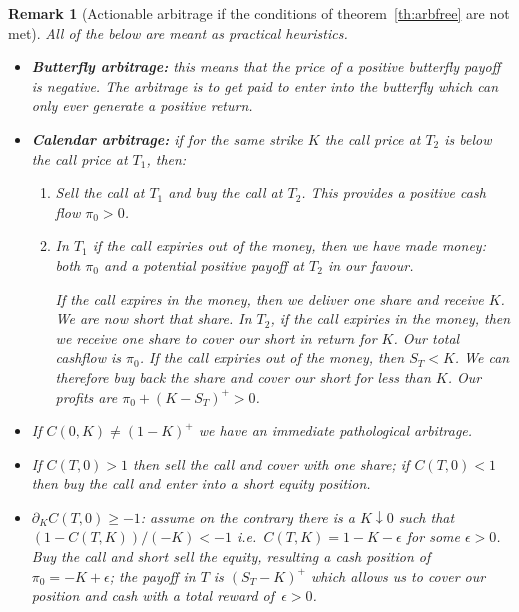 \documentclass[11pt,a4paper]{article}
\newtheorem{remark}[definition]{Remark}
\begin{document}
\begin{remark}[Actionable arbitrage if the conditions of theorem~\ref{th:arbfree} are not met]\label{rem:actionable_arbitrage}
All of the below are meant as practical heuristics.
\begin{itemize}
    \item \textbf{Butterfly arbitrage:} this means that the price of a positive
    butterfly payoff is negative. The arbitrage is to get paid to enter into 
    the butterfly which can only ever generate a positive return.

    \item \textbf{Calendar arbitrage:} if for the same strike $K$ 
    the call price at $T_2$ is below the call price
    at $T_1$, then:
    \begin{enumerate}
        \item 
            Sell the call at $T_1$ and buy the call at $T_2$. This provides
            a positive cash flow $\pi_0>0$.
        \item 
            In $T_1$ if the call expiries out of the money, then we have made money: both
            $\pi_0$ and a potential positive payoff at $T_2$ in our favour.

            If the call expires in the money, then we deliver one share
            and receive $K$. We are now short that share.
            In $T_2$, if the call expiries in the money, then we receive one share
            to cover our short in return for $K$. Our total cashflow is $\pi_0$.
            If the call expiries out of the money, then $S_T<K$. We can therefore
            buy back the share and cover our short for less than $K$.
            Our profits are $\pi_0+(K-S_T)^+>0$.
    \end{enumerate}
    \item If $C(0,K) \not= (1-K)^+$ we have an immediate pathological arbitrage.
    \item If $C(T,0)>1$ then sell the call and cover with one share; if $C(T,0)<1$
    then buy the call and enter into a short equity position.

    \item $\partial_K C(T,0)\geq -1$: assume on the contrary there is a $K\downarrow 0$
    such that $(1-C(T,K))/(-K) < -1$ i.e.~$C(T,K) = 1-K - \epsilon$ for some $\epsilon>0$.
          Buy the call and short sell the equity, resulting a cash position of $\pi_0=-K+\epsilon$;
          the payoff in $T$ is $(S_T-K)^+$ which allows us to cover our position and cash
          with a total reward of~$\epsilon>0$.


\end{itemize}
\end{remark}
\end{document}
